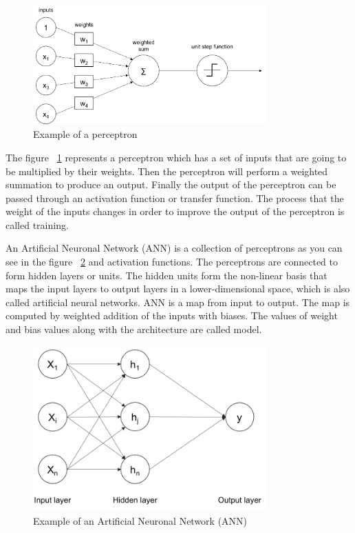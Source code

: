 \begin{figure}[H]
\centering
\includegraphics[width=0.8\textwidth]{./figures/perceptron}
\caption{Example of a perceptron \cite{rajalingappaa}}
\label{fig:perceptron}
\end{figure}
	
	
The figure ~\ref{fig:perceptron} represents a perceptron which has a set of inputs that are going to be multiplied by their weights.
Then the perceptron will perform a weighted summation to produce an output. \cite{sagar} Finally the output of the perceptron can be passed through an activation function or transfer function.\cite{rajalingappaa}
The process that the weight of the inputs changes in order to improve the output of the perceptron is called training. 

An Artificial Neuronal Network (ANN) is a collection of perceptrons as you can see in the figure ~\ref{fig:ann} and activation functions. The perceptrons are connected to form hidden layers or units. The hidden units form the non-linear basis that maps the input layers to output layers in a lower-dimensional space, which is also called artificial neural networks. ANN is a map from input to output. The map is computed by weighted addition of the inputs with biases. The values of weight and bias values along with the architecture are called model.

\begin{figure}[H]
\centering
\includegraphics[width=0.8\textwidth]{./figures/ann}
\caption{Example of an Artificial Neuronal Network (ANN) \cite{rajalingappaa}}
\label{fig:ann}
\end{figure}
 
